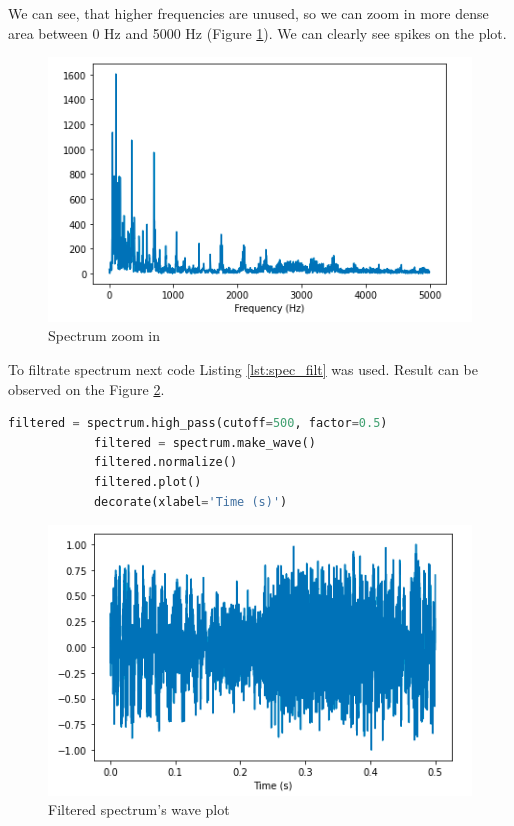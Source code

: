 \documentclass[a4paper]{article}
\begin{document}
        We can see, that higher frequencies are unused, so we can zoom in more dense area between 0 Hz and 5000 Hz (Figure \ref{fig:seg_spec_zoom}). We can clearly see spikes on the plot.
            
        \begin{figure}[H]
            \centering
            \includegraphics[width=\textwidth]{img/seg_spec_zoom.png}
            \caption{Spectrum zoom in}
            \label{fig:seg_spec_zoom}
        \end{figure}
            
        To filtrate spectrum next code Listing \ref{lst:spec_filt} was used. Result can be observed on the Figure \ref{fig:filt_wave_plot}.
        
        \begin{lstlisting}[language=Python,caption=Spectrum filtering,label={lst:spec_filt}]
            filtered = spectrum.high_pass(cutoff=500, factor=0.5)
            filtered = spectrum.make_wave()
            filtered.normalize()
            filtered.plot()
            decorate(xlabel='Time (s)')
        \end{lstlisting}
        
        \begin{figure}[H]
            \centering
            \includegraphics[width=\textwidth]{img/spec_filt_wave.png}
            \caption{Filtered spectrum's wave plot}
            \label{fig:filt_wave_plot}
        \end{figure}
        
\end{document}
